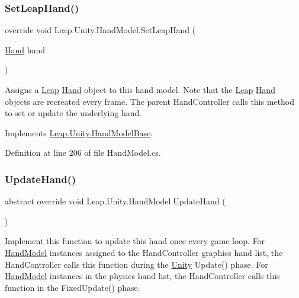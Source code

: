 \mbox{\label{class_leap_1_1_unity_1_1_hand_model_a73f417c17d35db37192c164193010ba0}} 
\subsubsection{\texorpdfstring{SetLeapHand()}{SetLeapHand()}}
{\footnotesize\ttfamily override void Leap.\+Unity.\+Hand\+Model.\+Set\+Leap\+Hand (\begin{DoxyParamCaption}\item[{\mbox{\hyperlink{class_leap_1_1_hand}{Hand}}}]{hand }\end{DoxyParamCaption})\hspace{0.3cm}{\ttfamily [virtual]}}

Assigns a \mbox{\hyperlink{namespace_leap_1_1_unity_1_1_leap}{Leap}} \mbox{\hyperlink{class_leap_1_1_hand}{Hand}} object to this hand model. Note that the \mbox{\hyperlink{namespace_leap_1_1_unity_1_1_leap}{Leap}} \mbox{\hyperlink{class_leap_1_1_hand}{Hand}} objects are recreated every frame. The parent Hand\+Controller calls this method to set or update the underlying hand. 

Implements \mbox{\hyperlink{class_leap_1_1_unity_1_1_hand_model_base_ab8830cac842482ed7d1045beeb54e98c}{Leap.\+Unity.\+Hand\+Model\+Base}}.



Definition at line 206 of file Hand\+Model.\+cs.

\mbox{\label{class_leap_1_1_unity_1_1_hand_model_acbb96fd18f28d01a74c1e0ac709b1977}} 
\subsubsection{\texorpdfstring{UpdateHand()}{UpdateHand()}}
{\footnotesize\ttfamily abstract override void Leap.\+Unity.\+Hand\+Model.\+Update\+Hand (\begin{DoxyParamCaption}{ }\end{DoxyParamCaption})\hspace{0.3cm}{\ttfamily [pure virtual]}}

Implement this function to update this hand once every game loop. For \mbox{\hyperlink{class_leap_1_1_unity_1_1_hand_model}{Hand\+Model}} instances assigned to the Hand\+Controller graphics hand list, the Hand\+Controller calls this function during the \mbox{\hyperlink{namespace_leap_1_1_unity}{Unity}} Update() phase. For \mbox{\hyperlink{class_leap_1_1_unity_1_1_hand_model}{Hand\+Model}} instances in the physics hand list, the Hand\+Controller calls this function in the Fixed\+Update() phase. 

